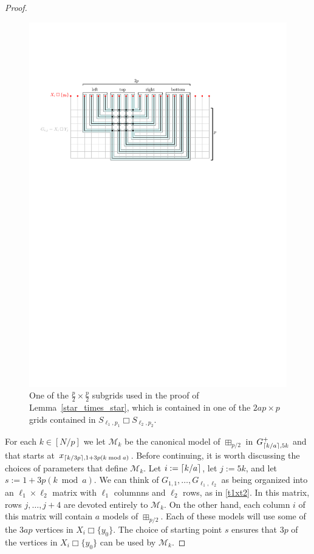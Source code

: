 \documentclass[lotsofwhite]{patmorin}
\newcommand{\boxprod}{\mathbin{\Box}}
\DeclarePairedDelimiter{\ceil}{\lceil}{\rceil}
\theoremstyle{plain}
\theoremstyle{definition}
\begin{document}
\begin{proof}
  \begin{figure}
    \begin{center}
      \includegraphics{subgrid}
    \end{center}
    \caption{One of the $\tfrac p2\times \tfrac p2$ subgrids used in the proof of Lemma~\ref{star_times_star}, which is contained in one of the $2ap\times p$ grids contained in $S_{\ell_1,p_1}\boxprod S_{\ell_2,p_2}$.}
    \label{subgrid}
  \end{figure}

  For each $k\in[N/p]$ we let $\mathcal{M}_k$ be the canonical model of $\boxplus_{p/2}$ in $G_{\ceil{k/a},5k}^+$ and that starts at $x_{\ceil{k/3p},1+3p(k\bmod a)}$.  Before continuing, it is worth discussing the choices of parameters that define $\mathcal{M}_k$.  Let $i:=\ceil{k/a}$, let $j:=5k$, and let $s:=1+3p(k\bmod a)$.  We can think of $G_{1,1},\ldots,G_{\ell_1,\ell_2}$ as being organized into an $\ell_1\times \ell_2$ matrix with $\ell_1$ columnns and $\ell_2$ rows, as in \cref{t1xt2}.  In this matrix, rows $j,\ldots,j+4$ are devoted entirely to $\mathcal{M}_{k}$.  On the other hand, each column $i$ of this matrix will contain $a$ models of $\boxplus_{p/2}$.  Each of these models will use some of the $3ap$ vertices in $X_i\boxprod\{y_0\}$.  The choice of starting point $s$ ensures that $3p$ of the vertices in $X_i\boxprod\{y_0\}$ can be used by $\mathcal{M}_k$.


\end{proof}
\end{document}
